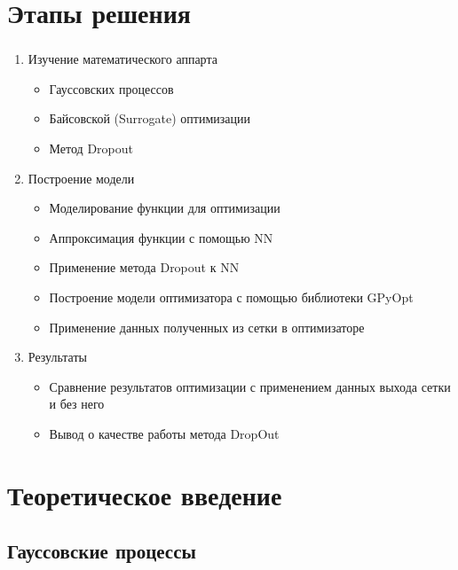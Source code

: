 \documentclass[t]{beamer}
\begin{document}
\section{Этапы решения} 
\begin{frame}
	\frametitle{\insertsection}
	\framesubtitle{\insertsubsection}
	
	\begin{enumerate}
		\item Изучение математического аппарта
		\begin{itemize}
			\item Гауссовских процессов
			\item Байсовской (Surrogate) оптимизации
			\item Метод Dropout 
		\end{itemize}
		\item Построение модели
		\begin{itemize}
			\item Моделирование функции для оптимизации
			\item Аппроксимация функции с помощью NN
			\item Применение метода Dropout к NN
			\item Построение модели оптимизатора с помощью библиотеки GPyOpt
			\item Применение данных полученных из сетки в оптимизаторе
		\end{itemize}
		\item Результаты
		\begin{itemize}
			\item Сравнение результатов оптимизации с применением данных выхода сетки и без него
			\item Вывод о качестве работы метода DropOut
		\end{itemize}
	\end{enumerate}
\end{frame}


\section{Теоретическое введение}

\subsection{Гауссовские процессы}
\end{document}
